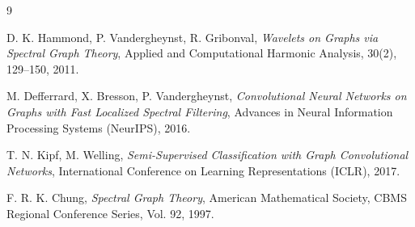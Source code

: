 \documentclass[12pt, a4paper]{article}
\theoremstyle{definition}
\begin{document}
\begin{thebibliography}{9}

D. K. Hammond, P. Vandergheynst, R. Gribonval,
\textit{Wavelets on Graphs via Spectral Graph Theory},
Applied and Computational Harmonic Analysis, 30(2), 129--150, 2011.

M. Defferrard, X. Bresson, P. Vandergheynst,
\textit{Convolutional Neural Networks on Graphs with Fast Localized Spectral Filtering},
Advances in Neural Information Processing Systems (NeurIPS), 2016.

T. N. Kipf, M. Welling,
\textit{Semi-Supervised Classification with Graph Convolutional Networks},
International Conference on Learning Representations (ICLR), 2017.

F. R. K. Chung,
\textit{Spectral Graph Theory},
American Mathematical Society, CBMS Regional Conference Series, Vol. 92, 1997.

\end{thebibliography}
\end{document}
